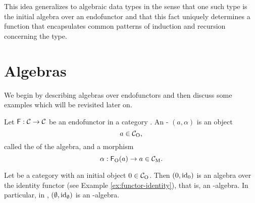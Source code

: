 This idea generalizes to algebraic data types in the sense that one
such type is the initial algebra over an endofunctor and that this
fact uniquely determines a function that encapsulates common patterns
of induction and recursion concerning the type.

\section{Algebras}
\label{sec:algebras}

We begin by describing algebras over endofunctors and then discuss some
examples which will be revisited later on.

\begin{definition}

  \label{def:algebra}


  Let $\mathsf{F}: \mathcal{C} \to \mathcal{C}$ be an endofunctor in a category
  . An - $(a,\alpha)$ is an object
  \begin{equation}
    \label{eq:al-carrier}
    a \in \mathcal{C}_{\operatorname{O}}
    \text{,}
  \end{equation}
  called the  of the algebra, and a morphism
  \begin{equation}
    \alpha: \mathsf{F}_{\operatorname{O}}(a) \to a \in \mathcal{C}_{\operatorname{M}}
    \text{.}
  \end{equation}

\end{definition}

\begin{example}

  \label{ex:algebra-initial-object}


  Let  be a category with an initial object $0 \in \mathcal{C}_{\operatorname{O}}$.
  Then $(0,\operatorname{id}_{0})$ is an algebra over the identity functor (see
  Example \ref{ex:functor-identity}), that is, an -algebra. In
  particular, in \set, $(\emptyset,\operatorname{id}_{\emptyset})$ is an
  -algebra.

\end{example}

